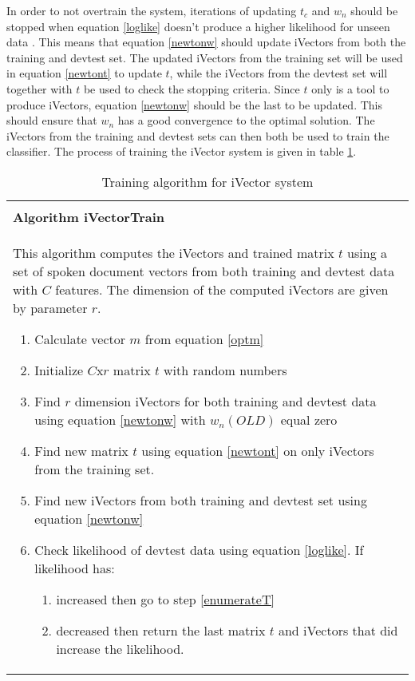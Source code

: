 In order to not overtrain the system, iterations of updating $t_c$ and $w_n$ should be stopped when equation \ref{loglike} doesn't produce a higher likelihood for unseen data \cite{liiVector}. This means that equation \ref{newtonw} should update iVectors from both the training and devtest set. The updated iVectors from the training set will be used in equation \ref{newtont} to update $t$, while the iVectors from the devtest set will together with $t$ be used to check the stopping criteria. Since $t$ only is a tool to produce iVectors, equation \ref{newtonw} should be the last to be updated. This should ensure that $w_n$ has a good convergence to the optimal solution. The iVectors from the training and devtest sets can then both be used to train the classifier. The process of training the iVector system is given in table \ref{algtrain}.

\begin{table}
\begin{tabular}{ | p{12cm} | }
\hline
\\
\textbf{Algorithm iVectorTrain}
\\
This algorithm computes the iVectors and trained matrix $t$ using a set of spoken document vectors from both training and devtest data with $C$ features. The dimension of the computed iVectors are given by parameter $r$.
\begin{enumerate}
  \item Calculate vector $m$ from equation \ref{optm} 
  \item Initialize $C$x$r$ matrix $t$ with random numbers
  \item Find $r$ dimension iVectors for both training and devtest data using equation \ref{newtonw} with $w_n(OLD)$ equal zero  
  \item \label{enumerateT} Find new matrix $t$ using equation \ref{newtont} on only iVectors from the training set.
  \item \label{enumerateW} Find new iVectors from both training and devtest set using equation \ref{newtonw}
  \item \label{stopcondition} Check likelihood of devtest data using equation \ref{loglike}. If likelihood has:
  \begin{enumerate}
    \item increased then go to step \ref{enumerateT}
    \item decreased then return the last matrix $t$ and iVectors that did increase the likelihood.
  \end{enumerate}
\end{enumerate}
\\
\hline
\end{tabular}
\caption{Training algorithm for iVector system}
\label{algtrain}
\end{table}

